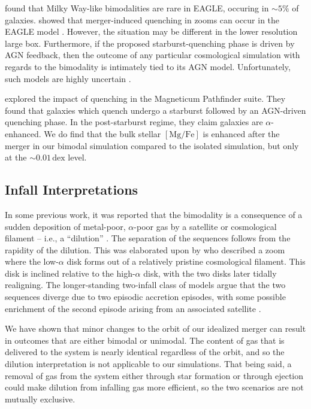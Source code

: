 \documentclass[linenumbers, twocolumn]{aastex631}
\newcommand{\MgFe}{\ensuremath{[\textrm{Mg}/\textrm{Fe}]}}
\newcommand{\dex}{\ensuremath{\textrm{dex}}}
\begin{document}
\citet{2018MNRAS.477.5072M} found that Milky Way-like bimodalities are rare in EAGLE, occuring in $\sim5\%$ of galaxies. \citet{2021MNRAS.501..236D,2022MNRAS.515.1430D} showed that merger-induced quenching in zooms can occur in the EAGLE model \citep[see also][]{2017MNRAS.465..547P}. However, the situation may be different in the lower resolution large box. Furthermore, if the proposed starburst-quenching phase is driven by AGN feedback, then the outcome of any particular cosmological simulation with regards to the bimodality is intimately tied to its AGN model. Unfortunately, such models are highly uncertain \citep[e.g.][]{2022MNRAS.511.3751H}.

\citet{2023arXiv231016085K} explored the impact of quenching in the Magneticum Pathfinder suite. They found that galaxies which quench undergo a starburst followed by an AGN-driven quenching phase. In the post-starburst regime, they claim galaxies are $\alpha$-enhanced. We do find that the bulk stellar \MgFe{} is enhanced after the merger in our bimodal simulation compared to the isolated simulation, but only at the $\sim0.01\,\dex$ level.

\subsection{Infall Interpretations}\label{ssec:dilute}
In some previous work, it was reported that the bimodality is a consequence of a sudden deposition of metal-poor, $\alpha$-poor gas by a satellite or cosmological filament -- i.e., a ``dilution'' \citep{2020MNRAS.491.5435B,2021MNRAS.503.5846R}. The separation of the sequences follows from the rapidity of the dilution. This was elaborated upon by \citet{2021MNRAS.503.5868R} who described a zoom where the low-$\alpha$ disk forms out of a relatively pristine cosmological filament. This disk is inclined relative to the high-$\alpha$ disk, with the two disks later tidally realigning. The longer-standing two-infall class of models argue that the two sequences diverge due to two episodic accretion episodes, with some possible enrichment of the second episode arising from an associated satellite \citep{1997ApJ...477..765C,2009IAUS..254..191C,2017MNRAS.472.3637G,2019A&A...623A..60S}.

We have shown that minor changes to the orbit of our idealized merger can result in outcomes that are either bimodal or unimodal. The content of gas that is delivered to the system is nearly identical regardless of the orbit, and so the dilution interpretation is not applicable to our simulations. That being said, a removal of gas from the system either through star formation or through ejection could make dilution from infalling gas more efficient, so the two scenarios are not mutually exclusive.
\end{document}
